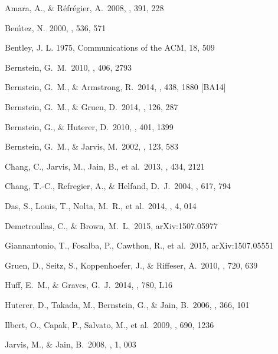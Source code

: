 \documentclass[11pt,preprint,flushrt]{aastex}
\begin{document}
\begin{thebibliography}{}

Amara, A., \& R{\'e}fr{\'e}gier, A.\ 2008, \mnras, 391, 228 

Ben{\'{\i}}tez, N.\ 2000, \apj, 536, 571 

Bentley, J. L. 1975, Communications of the ACM, 18, 509

Bernstein, G.~M.\ 2010, \mnras, 406, 2793 

Bernstein, G.~M., \& Armstrong, R.\ 2014, \mnras, 438, 1880 [BA14]

Bernstein, G.~M., \& Gruen, D.\ 2014, \pasp, 126, 287 

Bernstein, G., \& Huterer, D.\ 2010, \mnras, 401, 1399 

Bernstein, G.~M., \& Jarvis, M.\ 2002, \aj, 123, 583 

Chang, C., Jarvis, M., Jain, B., et al.\ 2013, \mnras, 434, 2121 

Chang, T.-C., Refregier, A., \& Helfand, D.~J.\ 2004, \apj, 617, 794 

Das, S., Louis, T., Nolta, M.~R., et al.\ 2014, \jcap, 4, 014 

Demetroullas, C., \& Brown, M.~L.\ 2015, arXiv:1507.05977 

Giannantonio, T., Fosalba, P., Cawthon, R., et al.\ 2015, arXiv:1507.05551 

Gruen, D., Seitz, S., Koppenhoefer, J., \& Riffeser, A.\ 2010, \apj, 720, 639 

Huff, E.~M., \& Graves, G.~J.\ 2014, \apjl, 780, L16 

Huterer, D., Takada, M., Bernstein, G., \& Jain, B.\ 2006, \mnras, 366, 101 

Ilbert, O., Capak, P., Salvato, M., et al.\ 2009, \apj, 690, 1236 

Jarvis, M., \& Jain, B.\ 2008, \jcap, 1, 003 


\end{thebibliography}
\end{document}

